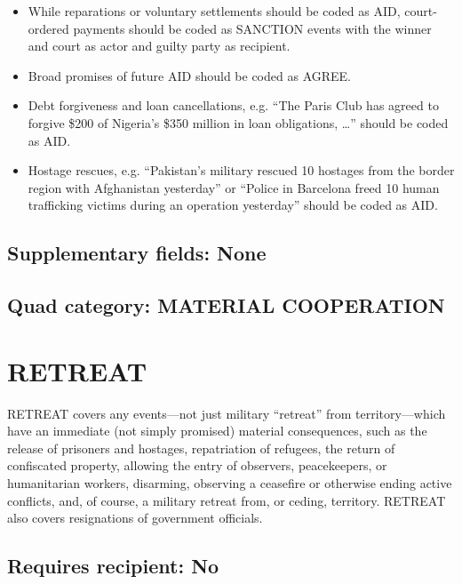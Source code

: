 \documentclass[11pt]{report}
\newcommand{\plcat}[1]{\textsf{#1}}
\begin{document}
\begin{itemize}
\item While reparations or voluntary settlements should be coded as \plcat{AID}, court-ordered payments should be coded as \plcat{SANCTION} events with the winner and court as actor and guilty party as recipient.
\item Broad promises of future \plcat{AID} should be coded as \plcat{AGREE}.
\item Debt forgiveness and loan cancellations, e.g. ``The Paris Club has agreed to forgive \$200 of Nigeria’s \$350 million in loan obligations, \dots'' should be coded as \plcat{AID}.
\item Hostage rescues, e.g. ``Pakistan’s military rescued 10 hostages from the border region with Afghanistan yesterday'' or ``Police in Barcelona freed 10 human trafficking victims during an operation yesterday'' should be coded as \plcat{AID}.
\end{itemize}

\subsection{Supplementary fields: None}

\subsection{Quad category: MATERIAL COOPERATION}

\newpage

\section{RETREAT}

\plcat{RETREAT} covers any events---not just military ``retreat'' from territory---which have an immediate (not simply promised) material consequences, such as the release of prisoners and hostages, repatriation of refugees, the return of  confiscated property, allowing the entry of observers, peacekeepers, or humanitarian workers, disarming, observing a ceasefire or otherwise ending active conflicts, and, of course, a military retreat from, or ceding, territory. \plcat{RETREAT} also covers resignations of government officials.

\subsection{Requires recipient: No}
\end{document}
